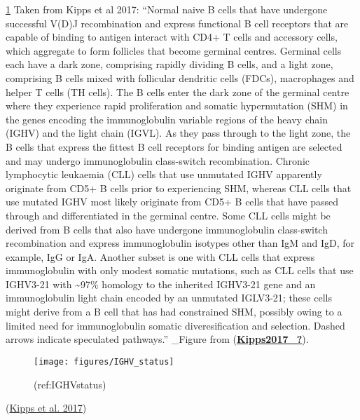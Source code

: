 \documentclass[11pt, a4paper, twosided]{book}
\begin{document}
\ref{fig:IGHVstatus} Taken from Kipps et al 2017: ``Normal naive B cells that have undergone successful V(D)J recombination and express functional B cell receptors that are capable of binding to antigen interact with CD4+ T cells and accessory cells, which aggregate to form follicles that become germinal centres. Germinal cells each have a dark zone, comprising rapidly dividing B cells, and a light zone, comprising B cells mixed with follicular dendritic cells (FDCs), macrophages and helper T cells (TH cells). The B cells enter the dark zone of the germinal centre where they experience rapid proliferation and somatic hypermutation (SHM) in the genes encoding the immunoglobulin variable regions of the heavy chain (IGHV) and the light chain (IGVL). As they pass through to the light zone, the B cells that express the fittest B cell receptors for binding antigen are selected and may undergo immunoglobulin class-switch recombination. Chronic lymphocytic leukaemia (CLL) cells that use unmutated IGHV apparently originate from CD5+ B cells prior to experiencing SHM, whereas CLL cells that use mutated IGHV most likely originate from CD5+ B cells that have passed through and differentiated in the germinal centre. Some CLL cells might be derived from B cells that also have undergone immunoglobulin class-switch recombination and express immunoglobulin isotypes other than IgM and IgD, for example, IgG or IgA. Another subset is one with CLL cells that express immunoglobulin with only modest somatic mutations, such as CLL cells that use IGHV3-21 with \textasciitilde97\% homology to the inherited IGHV3-21 gene and an immunoglobulin light chain encoded by an unmutated IGLV3-21; these cells might derive from a B cell that has had constrained SHM, possibly owing to a limited need for immunoglobulin somatic diveresification and selection. Dashed arrows indicate speculated pathways.'' \_Figure from (\protect\hyperlink{ref-Kipps2017_}{\textbf{Kipps2017\_?}}).
\begin{figure}

{\centering \texttt{[image: figures/IGHV\_status]} 

}

\caption{(ref:IGHVstatus)}\label{fig:IGHVstatus}
\end{figure}
(\protect\hyperlink{ref-Kipps2017}{Kipps et al. 2017})
\end{document}
